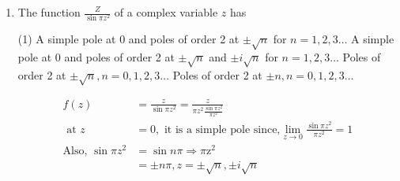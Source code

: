 \begin{enumerate}[label=\color{ocre}\textbf{\arabic*.}]
\begin{tasks}
		\task[\textbf{C.}] $\sqrt{2} \pi$
		\task[\textbf{D.}] $2 \pi$
	\end{tasks}
	\begin{answer}
		\begin{align*}
		\int_{-\infty}^{\infty} \frac{d z}{1+z^{4}} \quad \because|z|=R\\
		\text{Now, pole }z&=e^{(2 n+1) \frac{\pi}{4}}\\
		n&=0, \quad \Rightarrow z_{0}=e^{\frac{i \pi}{4}}=\frac{1}{\sqrt{2}}+i \frac{1}{\sqrt{2}}, n\\&=2 \Rightarrow z_{2}=\frac{-1}{\sqrt{2}}-i \frac{1}{\sqrt{2}}\\
		n&=1 \Rightarrow z_{1}=e^{\frac{i 3 \pi}{4}}=\frac{-1}{\sqrt{2}}+i \frac{1}{\sqrt{2}}, n\\&=3 \Rightarrow z_{3}=+\frac{1}{\sqrt{2}}-i \frac{1}{\sqrt{2}}
		\intertext{only $z_{0}$ and $z_{1}$ lies in contour}
		\text{i.e., residue at }\left(z=e^{\frac{i \pi}{4}}\right)&=\frac{1}{4}\left(-\frac{1}{\sqrt{2}}-i \frac{1}{\sqrt{2}}\right)\\
		\text{residue at }\left(z=e^{\frac{i 3 \pi}{4}}\right)&=\frac{1}{4}\left(\frac{1}{\sqrt{2}}-i \frac{1}{\sqrt{2}}\right)\\
		\text{now }\int_{-\infty}^{\infty} \frac{d x}{x^{4}+1}&=2 \pi i \Sigma \operatorname{Re} S=\frac{\pi}{\sqrt{2}}
		\end{align*}
		So the correct answer is \textbf{Option (A)}
	\end{answer}
	\item  The function $\frac{Z}{\sin \pi z^{2}}$ of a complex variable $z$ has
	{}
	\begin{tasks}(1)
		\task[\textbf{A.}] A simple pole at 0 and poles of order 2 at $\pm \sqrt{n}$ for $n=1,2,3 \ldots$
		\task[\textbf{B.}] A simple pole at 0 and poles of order 2 at $\pm \sqrt{n}$ and $\pm i \sqrt{n}$ for $n=1,2,3 \ldots$
		\task[\textbf{C.}] Poles of order 2 at $\pm \sqrt{n}, n=0,1,2,3 \ldots$
		\task[\textbf{D.}] Poles of order 2 at $\pm n, n=0,1,2,3 \ldots$
	\end{tasks}
	\begin{answer}
		\begin{align*}
		f(z)&=\frac{z}{\sin \pi z^{2}}=\frac{z}{\pi z^{2} \frac{\sin \pi z^{2}}{\pi z^{2}}}\\
		\text{	at }z&=0,\text{ it is a simple pole since,} \lim _{z \rightarrow 0} \frac{\sin \pi z^{2}}{\pi z^{2}}=1\\
		\text{Also, }\sin \pi z^{2}&=\sin n \pi \Rightarrow \pi \mathrm{z}^{2}\\&=\pm n \pi, z=\pm \sqrt{n}, \pm i \sqrt{n}\\

\end{align*}
\end{answer}
\end{enumerate}
